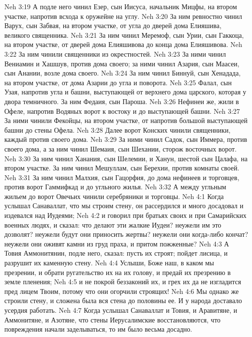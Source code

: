 \vs Neh 3:19 А подле него чинил Езер, сын Иисуса, начальник Мицфы, на втором участке, напротив всхода к оружейне на углу.
\vs Neh 3:20 За ним ревностно чинил Варух, сын Забвая, на втором участке, от угла до дверей дома Елияшива, великого священника.
\vs Neh 3:21 За ним чинил Меремоф, сын Урии, сын Гаккоца, на втором участке, от дверей дома Елияшивова до конца дома Елияшивова.
\vs Neh 3:22 За ним чинили священники из окрестностей.
\vs Neh 3:23 За ними чинил Вениамин и Хашшув, против дома своего; за ними чинил Азария, сын Маасеи, сын Анании, возле дома своего.
\vs Neh 3:24 За ним чинил Биннуй, сын Хенадада, на втором участке, от дома Азарии до угла и поворота.
\vs Neh 3:25  Фалал, сын Узая, напротив угла и башни, выступающей от верхнего дома царского, которая у двора темничного. За ним Федаия, сын Пароша.
\vs Neh 3:26 Нефинеи же,  жили в Офеле,  напротив Водяных ворот к востоку и до выступающей башни.
\vs Neh 3:27 За ними чинили Фекойцы, на втором участке, от  напротив большой выступающей башни до стены Офела.
\vs Neh 3:28 Далее ворот Конских чинили священники, каждый против своего дома.
\vs Neh 3:29 За ними чинил Садок, сын Иммера, против своего дома, а за ним чинил Шемаия, сын Шехании, сторож восточных ворот.
\vs Neh 3:30 За ним чинил Ханания, сын Шелемии, и Ханун, шестой сын Цалафа, на втором участке. За ним чинил Мешуллам, сын Берехии, против комнаты своей.
\vs Neh 3:31 За ним чинил Малхия, сын Гацорфия, до дома нефинеев и торговцев, против ворот Гаммифкад и до угльного жилья.
\vs Neh 3:32 А между угльным жильем до ворот Овечьих чинили серебряники и торговцы.
\vs Neh 4:1 Когда услышал Санаваллат, что мы строим стену, он рассердился и много досадовал и издевался над Иудеями;
\vs Neh 4:2 и говорил при братьях своих и при Самарийских военных людях, и сказал: что делают эти жалкие Иудеи? неужели им это дозволят? неужели будут они приносить жертвы? неужели они когда-либо кончат? неужели они оживят камни из груд праха, и притом пожженные?
\vs Neh 4:3 А Товия Аммонитянин,  подле него, сказал: пусть их строят; пойдет лисица, и разрушит их каменную стену.
\rsbpar\vs Neh 4:4 Услыши, Боже наш, в каком мы презрении, и обрати ругательство их на их голову, и предай их презрению в земле пленения;
\vs Neh 4:5 и не покрой беззаконий их, и грех их да не изгладится пред лицем Твоим, потому что они огорчили строящих!
\vs Neh 4:6 Мы однако же строили стену, и сложена была вся стена до половины ее. И у народа доставало усердия работать.
\rsbpar\vs Neh 4:7 Когда услышал Санаваллат и Товия, и Аравитяне, и Аммонитяне, и Азотяне, что стены Иерусалимские восстановляются, что повреждения начали заделываться, то им было весьма досадно.
